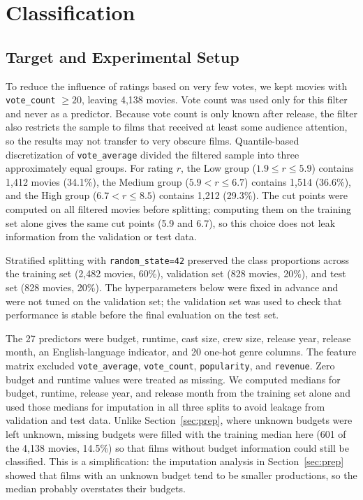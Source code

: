 \documentclass[conference]{IEEEtran}
\begin{document}
\section{Classification}\label{sec:classification}

\subsection{Target and Experimental Setup}
To reduce the influence of ratings based on very few votes, we kept movies with \texttt{vote\_count} $\geq 20$, leaving 4,138 movies. Vote count was used only for this filter and never as a predictor. Because vote count is only known after release, the filter also restricts the sample to films that received at least some audience attention, so the results may not transfer to very obscure films. Quantile-based discretization of \texttt{vote\_average} divided the filtered sample into three approximately equal groups. For rating $r$, the Low group ($1.9 \leq r \leq 5.9$) contains 1,412 movies (34.1\%), the Medium group ($5.9 < r \leq 6.7$) contains 1,514 (36.6\%), and the High group ($6.7 < r \leq 8.5$) contains 1,212 (29.3\%). The cut points were computed on all filtered movies before splitting; computing them on the training set alone gives the same cut points (5.9 and 6.7), so this choice does not leak information from the validation or test data.

Stratified splitting with \texttt{random\_state=42} preserved the class proportions across the training set (2,482 movies, 60\%), validation set (828 movies, 20\%), and test set (828 movies, 20\%). The hyperparameters below were fixed in advance and were not tuned on the validation set; the validation set was used to check that performance is stable before the final evaluation on the test set.

The 27 predictors were budget, runtime, cast size, crew size, release year, release month, an English-language indicator, and 20 one-hot genre columns. The feature matrix excluded \texttt{vote\_average}, \texttt{vote\_count}, \texttt{popularity}, and \texttt{revenue}. Zero budget and runtime values were treated as missing. We computed medians for budget, runtime, release year, and release month from the training set alone and used those medians for imputation in all three splits to avoid leakage from validation and test data. Unlike Section~\ref{sec:prep}, where unknown budgets were left unknown, missing budgets were filled with the training median here (601 of the 4,138 movies, 14.5\%) so that films without budget information could still be classified. This is a simplification: the imputation analysis in Section~\ref{sec:prep} showed that films with an unknown budget tend to be smaller productions, so the median probably overstates their budgets.
\end{document}
